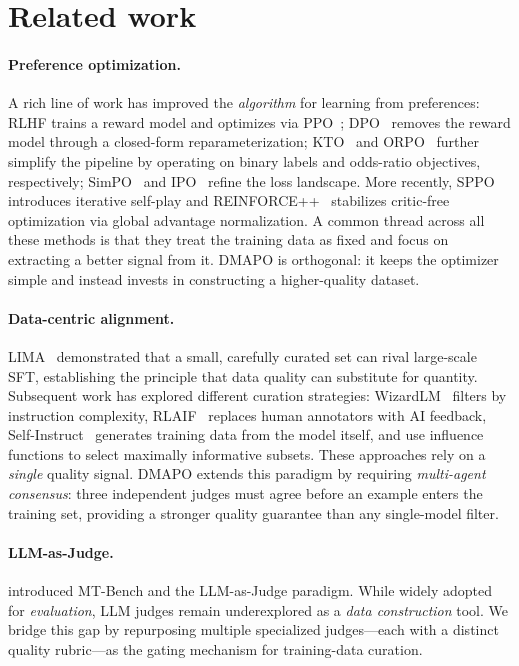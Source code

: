 \documentclass{article}
\newcommand{\method}{DMAPO}
\begin{document}
\section{Related work}
\label{sec:related}

\paragraph{Preference optimization.}
A rich line of work has improved the \emph{algorithm} for learning from preferences: RLHF trains a reward model and optimizes via PPO~\citep{ouyang2022training, schulman2017ppo}; DPO~\citep{rafailov2023dpo} removes the reward model through a closed-form reparameterization; KTO~\citep{ethayarajh2024kto} and ORPO~\citep{hong2024orpo} further simplify the pipeline by operating on binary labels and odds-ratio objectives, respectively; SimPO~\citep{meng2024simpo} and IPO~\citep{azar2024ipo} refine the loss landscape. More recently, SPPO~\citep{wu2024sppo} introduces iterative self-play and REINFORCE++~\citep{hu2025reinforceplusplus} stabilizes critic-free optimization via global advantage normalization. A common thread across all these methods is that they treat the training data as fixed and focus on extracting a better signal from it. \method{} is orthogonal: it keeps the optimizer simple and instead invests in constructing a higher-quality dataset.

\paragraph{Data-centric alignment.}
LIMA~\citep{zhou2023lima} demonstrated that a small, carefully curated set can rival large-scale SFT, establishing the principle that data quality can substitute for quantity. Subsequent work has explored different curation strategies: WizardLM~\citep{xu2024wizardlm} filters by instruction complexity, RLAIF~\citep{lee2024rlaif} replaces human annotators with AI feedback, Self-Instruct~\citep{wang2024selfinstruct} generates training data from the model itself, and \citet{xia2024less} use influence functions to select maximally informative subsets. These approaches rely on a \emph{single} quality signal. \method{} extends this paradigm by requiring \emph{multi-agent consensus}: three independent judges must agree before an example enters the training set, providing a stronger quality guarantee than any single-model filter.

\paragraph{LLM-as-Judge.}
\citet{zheng2023judging} introduced MT-Bench and the LLM-as-Judge paradigm. While widely adopted for \emph{evaluation}, LLM judges remain underexplored as a \emph{data construction} tool. We bridge this gap by repurposing multiple specialized judges---each with a distinct quality rubric---as the gating mechanism for training-data curation.
\end{document}
